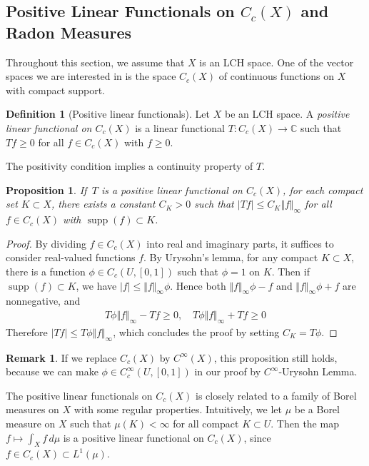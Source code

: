 \documentclass{article}
\numberwithin{equation}{section}
\newcommand{\bbC}{\mathbb{C}}
\DeclareMathOperator{\supp}{supp}
\theoremstyle{plain}
\newtheorem{proposition}[theorem]{Proposition}
\theoremstyle{definition}
\newtheorem{definition}[theorem]{Definition}
\newtheorem*{remark}{Remark}
\begin{document}
\newpage
\subsection{Positive Linear Functionals on $C_c(X)$ and Radon Measures}
Throughout this section, we assume that $X$ is an LCH space. One of the vector spaces we are interested in is the space $C_c(X)$ of continuous functions on $X$ with compact support.
\begin{definition}[Positive linear functionals]
	Let $X$ be an LCH space. A \textit{positive linear functional on $C_c(X)$} is a linear functional $T:C_c(X)\to\bbC$ such that $Tf\geq 0$ for all $f\in C_c(X)$ with $f\geq 0$.
\end{definition}

The positivity condition implies a continuity property of $T$.
\begin{proposition}\label{plfcont}
	If $\,T$ is a positive linear functional on $C_c(X)$, for each compact set $K\subset X$, there exists a constant $C_K>0$ such that $\vert Tf\vert\leq C_K\Vert f\Vert_\infty$ for all $f\in C_c(X)$ with $\supp(f)\subset K$.
\end{proposition}
\begin{proof}
	By dividing $f\in C_c(X)$ into real and imaginary parts, it suffices to consider real-valued functions $f$. By Urysohn's lemma, for any compact $K\subset X$, there is a function $\phi\in C_c(U,[0,1])$ such that $\phi=1$ on $K$. Then if $\supp(f)\subset K$, we have $\vert f\vert\leq\Vert f\Vert_\infty\phi$. Hence both $\Vert f\Vert_\infty\phi-f$ and $\Vert f\Vert_\infty\phi+f$ are nonnegative, and
	\begin{align*}
		T\phi\Vert f\Vert_\infty-Tf\geq 0,\quad T\phi\Vert f\Vert_\infty+Tf\geq 0
	\end{align*}
	Therefore $\vert Tf\vert\leq T\phi\Vert f\Vert_\infty$, which concludes the proof by setting $C_K=T\phi$.
\end{proof}
\begin{remark}
If we replace $C_c(X)$ by $C^\infty(X)$, this proposition still holds, because we can make $\phi\in C_c^\infty(U,[0,1])$ in our proof by $C^\infty$-Urysohn Lemma.
\end{remark}
The positive linear functionals on $C_c(X)$ is closely related to a family of Borel measures on $X$ with some regular properties. Intuitively, we let $\mu$ be a Borel measure on $X$ such that $\mu(K)<\infty$ for all compact $K\subset U$. Then the map $f\mapsto\int_X f\,d\mu$ is a positive linear functional on $C_c(X)$, since $f\in C_c(X)\subset L^1(\mu)$.
\end{document}
